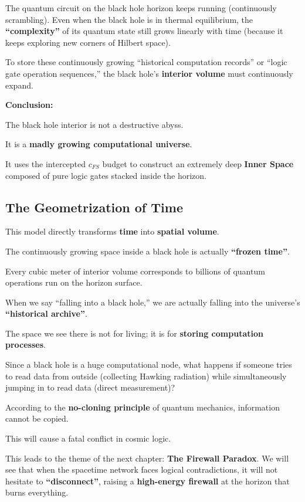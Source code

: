 The quantum circuit on the black hole horizon keeps running (continuously scrambling). Even when the black hole is in thermal equilibrium, the \textbf{``complexity''} of its quantum state still grows linearly with time (because it keeps exploring new corners of Hilbert space).

To store these continuously growing ``historical computation records'' or ``logic gate operation sequences,'' the black hole's \textbf{interior volume} must continuously expand.

\textbf{Conclusion:}

The black hole interior is not a destructive abyss.

It is a \textbf{madly growing computational universe}.

It uses the intercepted $c_{FS}$ budget to construct an extremely deep \textbf{Inner Space} composed of pure logic gates stacked inside the horizon.

\subsection{The Geometrization of Time}

This model directly transforms \textbf{time} into \textbf{spatial volume}.

The continuously growing space inside a black hole is actually \textbf{``frozen time''}.

Every cubic meter of interior volume corresponds to billions of quantum operations run on the horizon surface.

When we say ``falling into a black hole,'' we are actually falling into the universe's \textbf{``historical archive''}.

The space we see there is not for living; it is for \textbf{storing computation processes}.

Since a black hole is a huge computational node, what happens if someone tries to read data from outside (collecting Hawking radiation) while simultaneously jumping in to read data (direct measurement)?

According to the \textbf{no-cloning principle} of quantum mechanics, information cannot be copied.

This will cause a fatal conflict in cosmic logic.

This leads to the theme of the next chapter: \textbf{The Firewall Paradox}. We will see that when the spacetime network faces logical contradictions, it will not hesitate to \textbf{``disconnect''}, raising a \textbf{high-energy firewall} at the horizon that burns everything.


